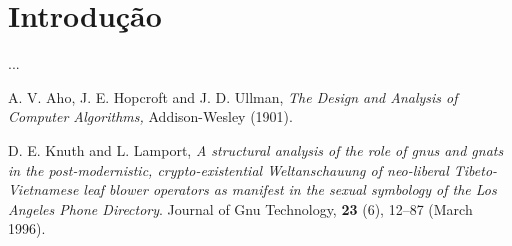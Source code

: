 \documentclass[11pt,twoside]{article}
\begin{document}
\section{Introdução}

 ...

\begin{thebibliography}{99}

 A. V. Aho, J. E. Hopcroft and J.  D.  Ullman, {\it The
Design and Analysis of Computer Algorithms,} Addison-Wesley (1901).

 D. E. Knuth and L. Lamport, {\it A structural analysis
of the role of gnus and gnats in the post-modernistic, crypto-existential 
Weltanschauung of neo-liberal Tibeto-Vietnamese leaf blower operators 
as manifest in the sexual symbology of the Los Angeles Phone Directory}.
Journal of Gnu Technology, {\bf 23} (6), 12--87
(March 1996).

\end{thebibliography}
\end{document}
